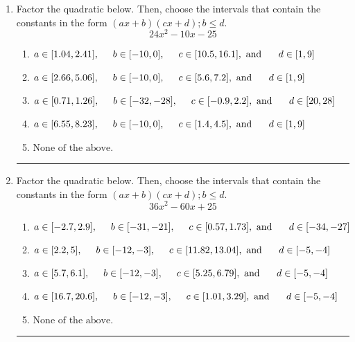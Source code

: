 \documentclass[14pt]{extbook}
\newcommand{\litem}[1]{\item#1\hspace*{-1cm}\rule{\textwidth}{0.4pt}}
\begin{document}
\begin{enumerate}
{\begin{enumerate}[label=\Alph*.]
\end{enumerate} }
\litem{
Factor the quadratic below. Then, choose the intervals that contain the constants in the form $(ax+b)(cx+d); b \leq d.$\[ 24x^{2} -10 x -25 \]\begin{enumerate}[label=\Alph*.]
\item \( a \in [1.04, 2.41], \hspace*{5mm} b \in [-10, 0], \hspace*{5mm} c \in [10.5, 16.1], \text{ and } \hspace*{5mm} d \in [1, 9] \)
\item \( a \in [2.66, 5.06], \hspace*{5mm} b \in [-10, 0], \hspace*{5mm} c \in [5.6, 7.2], \text{ and } \hspace*{5mm} d \in [1, 9] \)
\item \( a \in [0.71, 1.26], \hspace*{5mm} b \in [-32, -28], \hspace*{5mm} c \in [-0.9, 2.2], \text{ and } \hspace*{5mm} d \in [20, 28] \)
\item \( a \in [6.55, 8.23], \hspace*{5mm} b \in [-10, 0], \hspace*{5mm} c \in [1.4, 4.5], \text{ and } \hspace*{5mm} d \in [1, 9] \)
\item \( \text{None of the above.} \)

\end{enumerate} }
\litem{
Factor the quadratic below. Then, choose the intervals that contain the constants in the form $(ax+b)(cx+d); b \leq d.$\[ 36x^{2} -60 x + 25 \]\begin{enumerate}[label=\Alph*.]
\item \( a \in [-2.7, 2.9], \hspace*{5mm} b \in [-31, -21], \hspace*{5mm} c \in [0.57, 1.73], \text{ and } \hspace*{5mm} d \in [-34, -27] \)
\item \( a \in [2.2, 5], \hspace*{5mm} b \in [-12, -3], \hspace*{5mm} c \in [11.82, 13.04], \text{ and } \hspace*{5mm} d \in [-5, -4] \)
\item \( a \in [5.7, 6.1], \hspace*{5mm} b \in [-12, -3], \hspace*{5mm} c \in [5.25, 6.79], \text{ and } \hspace*{5mm} d \in [-5, -4] \)
\item \( a \in [16.7, 20.6], \hspace*{5mm} b \in [-12, -3], \hspace*{5mm} c \in [1.01, 3.29], \text{ and } \hspace*{5mm} d \in [-5, -4] \)
\item \( \text{None of the above.} \)


\end{enumerate}}
\end{enumerate}
\end{document}
